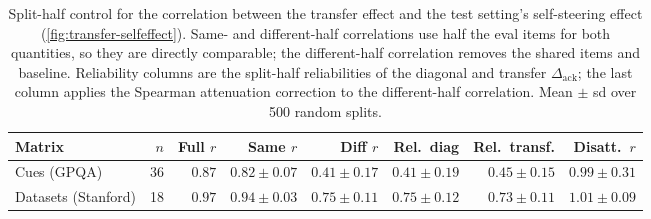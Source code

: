 \begin{table}[H]\centering\footnotesize
\setlength{\tabcolsep}{3pt}
\caption{Split-half control for the correlation between the transfer effect and the test setting's self-steering effect (\cref{fig:transfer-selfeffect}). Same- and different-half correlations use half the eval items for both quantities, so they are directly comparable; the different-half correlation removes the shared items and baseline. Reliability columns are the split-half reliabilities of the diagonal and transfer $\Delta_{\mathrm{ack}}$; the last column applies the Spearman attenuation correction to the different-half correlation. Mean $\pm$ sd over 500 random splits.}
\label{tab:splithalf-transfer}
\begin{tabular}{@{}l r r r r r r r@{}}
\toprule
Matrix & $n$ & Full $r$ & Same $r$ & Diff $r$ & Rel.\ diag & Rel.\ transf. & Disatt.\ $r$ \\
\midrule
Cues (GPQA) & 36 & $0.87$ & $0.82 \pm 0.07$ & $0.41 \pm 0.17$ & $0.41 \pm 0.19$ & $0.45 \pm 0.15$ & $0.99 \pm 0.31$ \\
Datasets (Stanford) & 18 & $0.97$ & $0.94 \pm 0.03$ & $0.75 \pm 0.11$ & $0.75 \pm 0.12$ & $0.73 \pm 0.11$ & $1.01 \pm 0.09$ \\
\bottomrule
\end{tabular}
\end{table}
